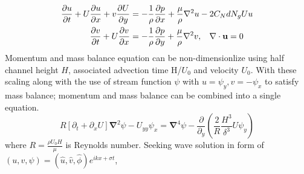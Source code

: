 \documentclass[aps,prl,twocolumn,showpacs,superscriptaddress,groupedaddress,10pt]{revtex4-1}  %
\newcommand{\bu}{\mathbf{u}}
\newcommand{\grad}{\mathbf{\nabla}}
\newcommand{\del}{\partial}
\begin{document}
\small
\begin{equation}
\begin{split}
\frac{\del u}{\del t}+U\frac{\del u}{\del x}+v\frac{\del U}{\del y} &= -\frac{1}{\rho}\frac{\del p}{\del x}+\frac{\mu}{\rho}\nabla^2u-2C_{N}dN_{g}Uu\\
\frac{\del v}{\del  t}+ U\frac{\del v}{\del x} &= -\frac{1}{\rho}\frac{\del p}{\del y}+\frac{\mu}{\rho}\nabla^2v, \hspace{0.3cm} \nabla\cdot\bu=0\\
\end{split}
\end{equation}
\normalsize
Momentum and mass balance equation can be non-dimensionlize using half channel height $H$, associated advection time H/$U_0$ and velocity $U_0$.
With these scaling along with the use of stream function $\psi$ with $u = \psi_{y}, v= -\psi_x$ to satisfy mass balance; momentum and mass balance can be combined 
into a single equation.
\small
\begin{equation}
R\left[\del_t+\del_x U \right]\grad^2\psi - U_{yy}\psi_x = \grad^4\psi-\frac{\del}{\del_y}\left(\frac{2}{R}\frac{H^3}{\delta^3}U\psi_y\right)
\end{equation}
\normalsize
where $R= \frac{\rho U_0 H}{\mu}$ is Reynolds number. Seeking wave solution in form of $\left(u,v,\psi \right)= \left(\hat u, \hat v, \hat\phi \right)e^{ikx+\sigma t}$, 
\end{document}
